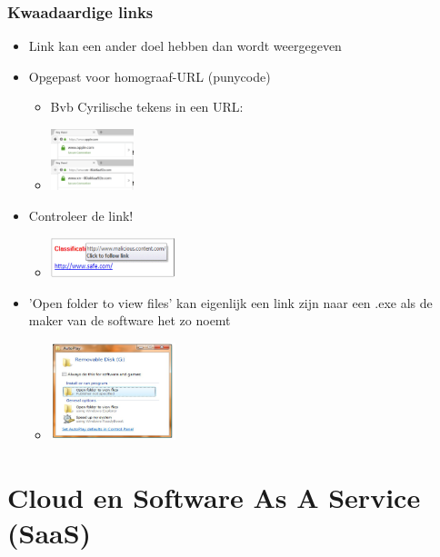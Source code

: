 \documentclass{article}
\begin{document}
\subsubsection{Kwaadaardige links}

\begin{itemize}
    \item Link kan een ander doel hebben dan wordt weergegeven
    \item Opgepast voor homograaf-URL (punycode)
    \begin{itemize}
        \item Bvb Cyrilische tekens in een URL:
        \item \includegraphics[width=0.2\textwidth]{link2.png}
    \end{itemize}
    \item Controleer de link! 
    \begin{itemize}
        \item \includegraphics[width=0.3\textwidth]{link.png}
    \end{itemize}
    \item 'Open folder to view files' kan eigenlijk een link zijn naar een .exe als de maker van de software het zo noemt
    \begin{itemize}
        \item \includegraphics[width=0.3\textwidth]{open-folder.png}
    \end{itemize}
\end{itemize}

\section{Cloud en Software As A Service (SaaS)}
\end{document}
